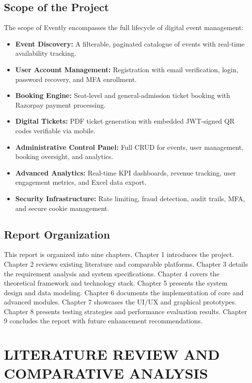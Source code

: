 \documentclass[12pt,a4paper]{report}
\begin{document}
\section{Scope of the Project}
The scope of Evently encompasses the full lifecycle of digital event management:
\begin{itemize}[leftmargin=2em]
    \item \textbf{Event Discovery:} A filterable, paginated catalogue of events with real-time availability tracking.
    \item \textbf{User Account Management:} Registration with email verification, login, password recovery, and MFA enrollment.
    \item \textbf{Booking Engine:} Seat-level and general-admission ticket booking with Razorpay payment processing.
    \item \textbf{Digital Tickets:} PDF ticket generation with embedded JWT-signed QR codes verifiable via mobile.
    \item \textbf{Administrative Control Panel:} Full CRUD for events, user management, booking oversight, and analytics.
    \item \textbf{Advanced Analytics:} Real-time KPI dashboards, revenue tracking, user engagement metrics, and Excel data export.
    \item \textbf{Security Infrastructure:} Rate limiting, fraud detection, audit trails, MFA, and secure cookie management.
\end{itemize}

\section{Report Organization}
This report is organized into nine chapters. Chapter 1 introduces the project. Chapter 2 reviews existing literature and comparable platforms. Chapter 3 details the requirement analysis and system specifications. Chapter 4 covers the theoretical framework and technology stack. Chapter 5 presents the system design and data modeling. Chapter 6 documents the implementation of core and advanced modules. Chapter 7 showcases the UI/UX and graphical prototypes. Chapter 8 presents testing strategies and performance evaluation results. Chapter 9 concludes the report with future enhancement recommendations.

\chapter{LITERATURE REVIEW AND COMPARATIVE ANALYSIS}
\end{document}
